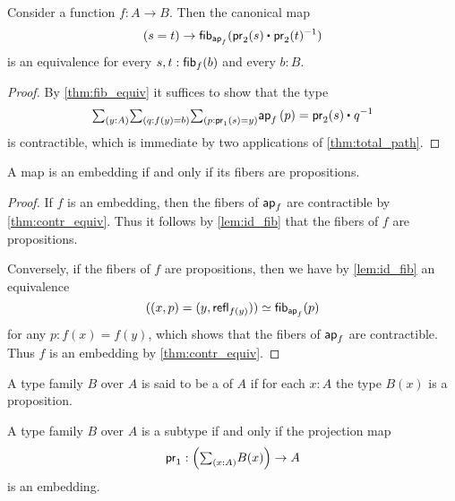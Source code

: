 \begin{lem}\label{lem:id_fib}
Consider a function $f:A\to B$. Then the canonical map
\begin{equation*}
(s=t)\to \fib{\apfunc{f}}{\ct{\proj 2(s)}{\proj 2(t)^{-1}}}
\end{equation*}
is an equivalence for every $s,t:\mathsf{fib}_{f}(b)$ and every $b:B$. 
\end{lem}

\begin{proof}
By \cref{thm:fib_equiv} it suffices to show that the type
\begin{equation*}
\sm{y:A}{q:f(y)=b}{p:\proj 1(s)=y} \ap{f}{p}=\ct{\proj 2(s)}{q^{-1}}
\end{equation*}
is contractible, which is immediate by two applications of \cref{thm:total_path}.
\end{proof}

\begin{prp}\label{thm:prop_emb}
A map is an embedding if and only if its fibers are propositions.
\end{prp}

\begin{proof}
If $f$ is an embedding, then the fibers of $\mathsf{ap}_{f}$ are contractible by \cref{thm:contr_equiv}. Thus it follows by \cref{lem:id_fib} that the fibers of $f$ are propositions.

Conversely, if the fibers of $f$ are propositions, then we have by \cref{lem:id_fib} an equivalence
\begin{equation*}
\eqv{((x,p)=(y,\refl{f(y)}))}{\fib{\apfunc{f}}{p}}
\end{equation*}
for any $p:f(x)=f(y)$, which shows that the fibers of $\mathsf{ap}_{f}$ are contractible. Thus $f$ is an embedding by \cref{thm:contr_equiv}.
\end{proof}

\begin{defn}
A type family $B$ over $A$ is said to be a  of $A$ if for each $x:A$ the type $B(x)$ is a proposition.
\end{defn}

\begin{cor}\label{thm:subtype}
A type family $B$ over $A$ is a subtype if and only if the projection map
\begin{equation*}
\proj 1 : \Big(\sm{x:A}B(x)\Big)\to A
\end{equation*}
is an embedding.
\end{cor}

